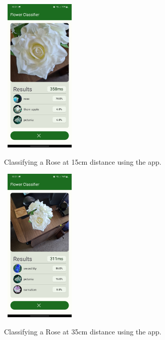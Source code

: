 \documentclass{article}
\begin{document}
\begin{figure}[h]\
    \includegraphics[width=0.3\textwidth]{rose_15cm.jpg}
    \caption{Classifying a Rose at 15cm distance using the app.}
    \label{fig:rose_15}
\end{figure}

\begin{figure}[h]\
    \includegraphics[width=0.3\textwidth]{rose_35cm.jpg}
    \caption{Classifying a Rose at 35cm distance using the app.}
    \label{fig:rose_35}
\end{figure}
\end{document}
